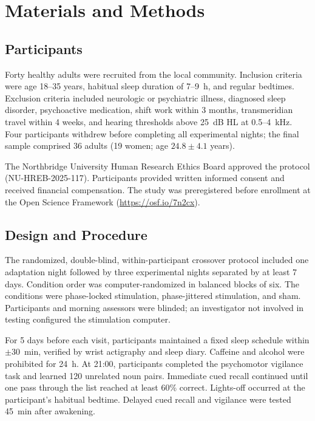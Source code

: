 \section{Materials and Methods}

\subsection{Participants}

Forty healthy adults were recruited from the local community. Inclusion criteria were age 18--35 years, habitual sleep duration of 7--9~h, and regular bedtimes. Exclusion criteria included neurologic or psychiatric illness, diagnosed sleep disorder, psychoactive medication, shift work within 3 months, transmeridian travel within 4 weeks, and hearing thresholds above 25~dB HL at 0.5--4~kHz. Four participants withdrew before completing all experimental nights; the final sample comprised 36 adults (19 women; age $24.8\pm4.1$ years).

The Northbridge University Human Research Ethics Board approved the protocol (NU-HREB-2025-117). Participants provided written informed consent and received financial compensation. The study was preregistered before enrollment at the Open Science Framework (\url{https://osf.io/7n2cx}).

\subsection{Design and Procedure}

The randomized, double-blind, within-participant crossover protocol included one adaptation night followed by three experimental nights separated by at least 7 days. Condition order was computer-randomized in balanced blocks of six. The conditions were phase-locked stimulation, phase-jittered stimulation, and sham. Participants and morning assessors were blinded; an investigator not involved in testing configured the stimulation computer.

For 5 days before each visit, participants maintained a fixed sleep schedule within $\pm30$~min, verified by wrist actigraphy and sleep diary. Caffeine and alcohol were prohibited for 24~h. At 21:00, participants completed the psychomotor vigilance task and learned 120 unrelated noun pairs. Immediate cued recall continued until one pass through the list reached at least 60\% correct. Lights-off occurred at the participant's habitual bedtime. Delayed cued recall and vigilance were tested 45~min after awakening.

